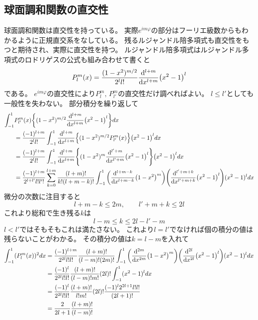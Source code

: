\documentclass[../master.tex]{subfiles}
\begin{document}
\subsection{球面調和関数の直交性}
球面調和関数は直交性を持っている。
実際\(e^{im\varphi}\)の部分はフーリエ級数からもわかるように正規直交系をなしている。
残るルジャンドル陪多項式も直交性をもつと期待され、実際に直交性を持つ。
ルジャンドル陪多項式はルジャンドル多項式のロドリゲスの公式も組み合わせて書くと
\begin{equation}
	P_l^m(x) = \frac{(1-x^2)^{m/2}}{2^l l!}\dv[l+m]{x}\qty(x^2-1)^l
\end{equation}
である。
\(e^{im\varphi}\)の直交性により\(P_l^m,\,P_{l'}^m\)の直交性だけ調べればよい。
\(l\leq l'\)としても一般性を失わない。
部分積分を繰り返して
\begin{equation}\begin{aligned}[b]
    \int_{-1}^{1} &P_{l'}^{m}(x)\qty{(1-x^2)^{m/2}\dv[l+m]{x}\qty(x^2-1)^l} dx \\
	&= \frac{(-1)^{l+m}}{2^l l!}\int_{-1}^{1} \dv[l+m]{x}\Bigl\{(1-x^2)^{m/2}P_{l'}^{m}(x)\Bigr\}\qty(x^2-1)^l dx\\
	&= \frac{(-1)^{l+m}}{2^l l!}\int_{-1}^{1} \dv[l+m]{x}\qty{(1-x^2)^{m}\dv[l'+m]{x}(x^2-1)^l}\qty(x^2-1)^l dx\\
	&= \frac{(-1)^{l+m}}{2^{l+l'} l!l'!}\sum_{k=0}^{l+m} \frac{(l+m)!}{k!(l+m-k)!}
	\int_{-1}^{1}\qty(\dv[l+m-k]{x}(1-x^2)^m)\qty(\dv[l'+m+k]{x}(x^2-1)^l)(x^2-1)^l dx
\end{aligned}\end{equation}
微分の次数に注目すると
\begin{equation}
	l+m-k \leq 2m,\qquad l'+m+k \leq 2l
\end{equation}
これより総和で生き残る\(k\)は
\begin{equation}
	l-m\leq k \leq 2l - l' -m
\end{equation}
\(l<l'\)ではそもそもこれは満たさない。
これより\(l=l'\)でなければ個の積分の値は残らないことがわかる。
その積分の値は\(k=l-m\)を入れて
\begin{equation}\begin{aligned}[b]
    \int_{-1}^{1} (P_l^m(x))^2 dx
	&=\frac{(-1)^{l+m}}{2^{2l}l!l!}\frac{(l+m)!}{(l-m)!(2m)!}
	\int_{-1}^{1}\qty(\dv[2m]{x}(1-x^2)^m)\qty(\dv[2l]{x}(x^2-1)^l)(x^2-1)^l dx\\
	&=\frac{(-1)^l}{2^{2l}l!l!}\frac{(l+m)!}{(l-m)!m!}(2l)!
	\int_{-1}^{1}(x^2-1)^l dx\\
	&=\frac{(-1)^l}{2^{2l}l!l!}\frac{(l+m)!}{l!m!}(2l)!\frac{(-1)^l2^{2l+1}l!l!}{(2l+1)!}\\
	&=\frac{2}{2l+1}\frac{(l+m)!}{(l-m)!}
\end{aligned}\end{equation}
\end{document}
